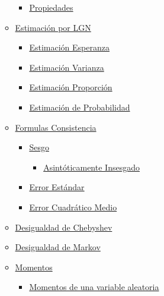 \documentclass[
]{article}
\providecommand{\tightlist}{%
  \setlength{\itemsep}{0pt}\setlength{\parskip}{0pt}}
\begin{document}
\begin{itemize}
\begin{itemize}
    \begin{itemize}
    \tightlist
    \item
      \protect\hyperlink{propiedades}{Propiedades}
    \end{itemize}
  \item
    \protect\hyperlink{estimaciuxf3n-por-lgn}{Estimación por LGN}

    \begin{itemize}
    \tightlist
    \item
      \protect\hyperlink{estimaciuxf3n-esperanza}{Estimación Esperanza}
    \item
      \protect\hyperlink{estimaciuxf3n-varianza}{Estimación Varianza}
    \item
      \protect\hyperlink{estimaciuxf3n-proporciuxf3n}{Estimación
      Proporción}
    \item
      \protect\hyperlink{estimaciuxf3n-de-probabilidad}{Estimación de
      Probabilidad}
    \end{itemize}
  \item
    \protect\hyperlink{formulas-consistencia}{Formulas Consistencia}

    \begin{itemize}
    \tightlist
    \item
      \protect\hyperlink{sesgo}{Sesgo}

      \begin{itemize}
      \tightlist
      \item
        \protect\hyperlink{asintuxf3ticamente-insesgado}{Asintóticamente
        Insesgado}
      \end{itemize}
    \item
      \protect\hyperlink{error-estuxe1ndar}{Error Estándar}
    \item
      \protect\hyperlink{error-cuadruxe1tico-medio}{Error Cuadrático
      Medio}
    \end{itemize}
  \item
    \protect\hyperlink{desigualdad-de-chebyshev}{Desigualdad de
    Chebyshev}
  \item
    \protect\hyperlink{desigualdad-de-markov}{Desigualdad de Markov}
  \item
    \protect\hyperlink{momentos}{Momentos}

    \begin{itemize}
    \tightlist
    \item
      \protect\hyperlink{momentos-de-una-variable-aleatoria}{Momentos de
      una variable aleatoria}


\end{itemize}
\end{itemize}
\end{itemize}
\end{document}
